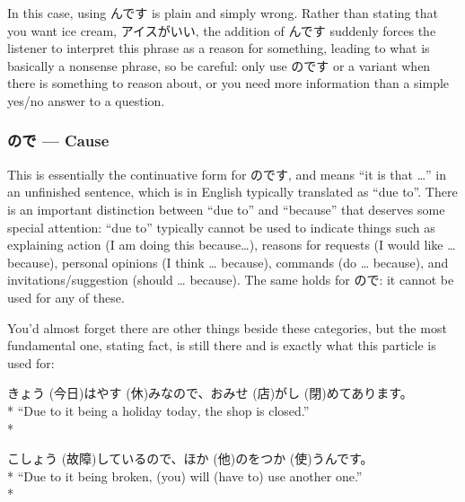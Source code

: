 \documentclass[11pt, b5paper, twoside, openright, onecolumn]{book}
\makeatletter
\newcommand*{\rubystack}[2]{{\relscale{0.5}%
  \begin{tabular}[b]{@{}c@{}}%
    {#1}\\%
   {\textscale{2}{#2}}%
  \end{tabular}}%
}
\DeclareRobustCommand*{\ruby}[2]{%
  \mbox{%
    \setlength{\parskip}{0ex}%
    \BeginAccSupp{method=pdfstringdef,ActualText={#1}}%
      \rubystack{\phantom{#2}}{#1}%
      \llap{%
        \rubystack{#2}{\phantom{#1}}%
      }%
    \EndAccSupp{}%
  }%
}
\renewcommand*{\ruby}[2]{#2 (#1)}%
\newenvironment{exampleblock}{
\setlength{\parindent}{0.6in}
\begin{minipage}[t]{\dimexpr\textwidth-\parindent}}
{\end{minipage}}
\makeatother
\begin{document}
In this case‚ using んです is plain and simply wrong. Rather than stating that you want ice cream‚ アイスがいい‚ the addition of んです suddenly forces the listener to interpret this phrase as a reason for something‚ leading to what is basically a nonsense phrase‚ so be careful: only use のです or a variant when there is something to reason about‚ or you need more information than a simple yes/no answer to a question.

\subsubsection{ので — Cause}

This is essentially the continuative form for のです‚ and means “it is that …” in an unfinished sentence‚ which is in English typically translated as “due to”. There is an important distinction between “due to” and “because” that deserves some special attention: “due to” typically cannot be used to indicate things such as explaining  action (I am doing this because…)‚ reasons for requests (I would like … because)‚ personal opinions (I think … because)‚ commands (do … because)‚ and invitations/suggestion (should … because). The same holds for ので: it cannot be used for any of these.

You’d almost forget there are other things beside these categories‚ but the most fundamental one‚ stating fact‚ is still there and is exactly what this particle is used for:

\vspace{0.4cm}
\begin{exampleblock}
\ruby{今日}{きょう}は\ruby{休}{やす}みなので、お\ruby{店}{みせ}が\ruby{閉}{し}めてあります。 \\* 
“Due to it being a holiday today‚ the shop is closed.” \\* 
\end{exampleblock}
\vspace{0.2cm}

\begin{exampleblock}
\ruby{故障}{こしょう}しているので、\ruby{他}{ほか}のを\ruby{使}{つか}うんです。 \\* 
“Due to it being broken‚ (you) will (have to) use another one.” \\* 
\end{exampleblock}
\vspace{0.2cm}
\end{document}
